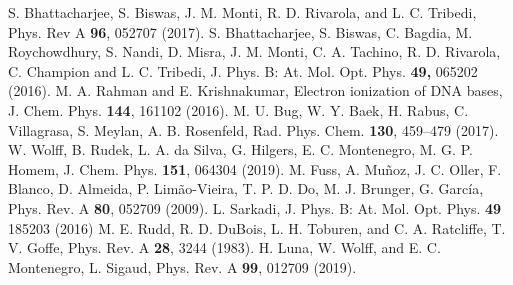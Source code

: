 \documentclass[10pt,showpacs,showkeys,twocolumn]{revtex4-1}
\begin{document}
\begin{thebibliography}{}
S. Bhattacharjee, S. Biswas, J. M. Monti, R. D. Rivarola, and 
L. C. Tribedi,
Phys. Rev A \textbf{96}, 052707 (2017).
S. Bhattacharjee, S. Biswas, C. Bagdia, M. Roychowdhury, S. Nandi, 
D. Misra, J. M. Monti, C. A. Tachino, R. D. Rivarola, C. Champion and 
L. C. Tribedi, J. 
Phys. B: At. Mol. Opt. Phys. \textbf{49,}  065202 (2016).
M. A. Rahman and E. Krishnakumar,
Electron ionization of DNA bases,
J. Chem. Phys. \textbf{144}, 161102 (2016).
M. U. Bug, W. Y. Baek, H. Rabus, C. Villagrasa, S. Meylan, 
A. B. Rosenfeld,
Rad. Phys. Chem. \textbf{130}, 459--479 (2017).
W. Wolff, B. Rudek, L. A. da Silva, G. Hilgers, E. C. Montenegro, 
M. G. P. Homem,
J. Chem. Phys. \textbf{151}, 064304 (2019).
M. Fuss, A. Muñoz, J. C. Oller, F. Blanco, D. Almeida, P. Limão-Vieira, 
T. P. D. Do, M. J. Brunger, G. Garc\'{i}a,
Phys. Rev. A \textbf{80}, 052709 (2009).
L. Sarkadi, 
J. Phys. B: At. Mol. Opt. Phys. \textbf{49} 185203 (2016)
M. E. Rudd, R. D. DuBois, L. H. Toburen, and C. A. Ratcliffe, 
T. V. Goffe, 
Phys. Rev. A \textbf{28}, 3244 (1983).
H. Luna, W. Wolff, and E. C. Montenegro, L. Sigaud, 
Phys. Rev. A \textbf{99}, 012709 (2019).

\end{thebibliography}
\end{document}

